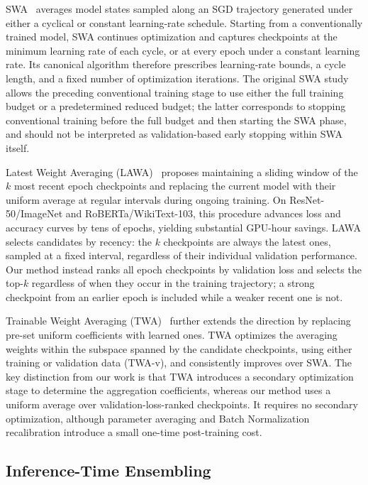 \documentclass[runningheads]{llncs}
\begin{document}
SWA~\cite{izmailov2019averagingweightsleadswider} averages model states
sampled along an SGD trajectory generated under either a cyclical or
constant learning-rate schedule.
Starting from a conventionally trained model, SWA continues optimization
and captures checkpoints at the minimum learning rate of each cycle, or
at every epoch under a constant learning rate.
Its canonical algorithm therefore prescribes learning-rate bounds, a cycle
length, and a fixed number of optimization iterations.
The original SWA study allows the preceding conventional training stage to
use either the full training budget or a predetermined reduced budget;
the latter corresponds to stopping conventional training before the full
budget and then starting the SWA phase, and should not be interpreted as
validation-based early stopping within SWA itself.

Latest Weight Averaging (LAWA)~\cite{kaddour2022stop} proposes maintaining
a sliding window of the $k$ most recent epoch checkpoints and replacing the
current model with their uniform average at regular intervals during
ongoing training.
On ResNet-50/ImageNet and RoBERTa/WikiText-103, this procedure advances
loss and accuracy curves by tens of epochs, yielding substantial GPU-hour
savings.
LAWA selects candidates by recency: the $k$ checkpoints are always the
latest ones, sampled at a fixed interval, regardless of their individual
validation performance.
Our method instead ranks all epoch checkpoints by validation loss and
selects the top-$k$ regardless of when they occur in the training
trajectory; a strong checkpoint from an earlier epoch is included while a
weaker recent one is not.

Trainable Weight Averaging (TWA)~\cite{li2022trainable} further extends the
direction by replacing pre-set uniform coefficients with learned ones.
TWA optimizes the averaging weights within the subspace spanned by the
candidate checkpoints, using either training or validation data
(TWA-v), and consistently improves over SWA.
The key distinction from our work is that TWA introduces a secondary
optimization stage to determine the aggregation coefficients, whereas our
method uses a uniform average over validation-loss-ranked checkpoints. It
requires no secondary optimization, although parameter averaging and Batch
Normalization recalibration introduce a small one-time post-training cost.

\subsection{Inference-Time Ensembling}
\end{document}
